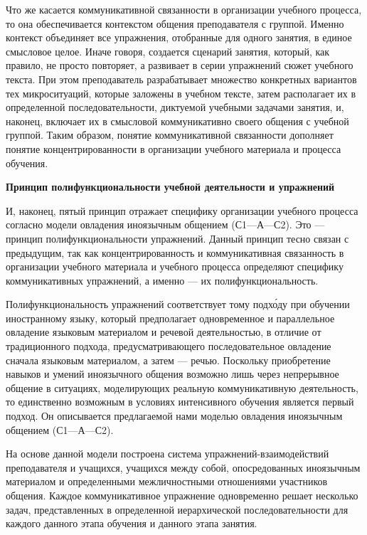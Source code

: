 Что же касается коммуникативной связанности в организации учебного процесса, то она обеспечивается контекстом общения преподавателя с группой. Именно контекст объединяет все упражнения, отобранные для одного занятия, в единое смысловое целое. Иначе говоря, создается сценарий занятия, который, как правило, не просто повторяет, а развивает в серии упражнений сюжет учебного текста. При этом преподаватель разрабатывает множество конкретных вариантов тех микроситуаций, которые заложены в учебном тексте, затем располагает их в определенной последовательности, диктуемой учебными задачами занятия, и, наконец, включает их в смысловой коммуникативно  своего общения с учебной группой. Таким образом, понятие коммуникативной связанности дополняет понятие концентрированности в организации учебного материала и процесса обучения.

\textbf{Принцип полифункциональности учебной деятельности и упражнений}

И, наконец, пятый принцип отражает специфику организации учебного процесса согласно модели овладения иноязычным общением (С1—А—С2). Это --- принцип полифункциональности упражнений. Данный принцип тесно связан с предыдущим, так как концентрированность и коммуникативная связанность в организации учебного материала и учебного процесса определяют специфику коммуникативных упражнений, а именно --- их полифункциональность.

Полифункциональность упражнений соответствует тому подх\'{о}ду при обучении иностранному языку, который предполагает одновременное и параллельное овладение языковым материалом и речевой деятельностью, в отличие от традиционного подхода, предусматривающего последовательное овладение сначала языковым материалом, а затем --- речью. Поскольку приобретение навыков и умений иноязычного общения возможно лишь через непрерывное общение в ситуациях, моделирующих реальную коммуникативную деятельность, то единственно возможным в условиях интенсивного обучения является первый подход. Он описывается предлагаемой нами моделью овладения иноязычным общением (С1—А—С2).

На основе данной модели построена система упражнений-взаимодействий преподавателя и учащихся, учащихся между собой, опосредованных иноязычным материалом и определенными межличностными отношениями участников общения. Каждое коммуникативное упражнение одновременно решает несколько задач, представленных в определенной иерархической последовательности для каждого данного этапа обучения и данного этапа занятия.

